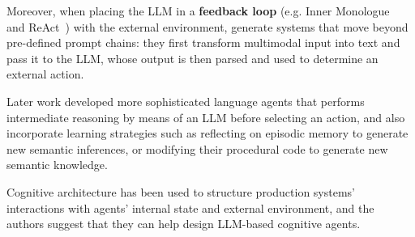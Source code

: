 Moreover, when placing the \ac{LLM} in a \textbf{feedback loop} (e.g. Inner
Monologue~\cite{huang2022innermonologueembodiedreasoning} and
ReAct~\cite{yao2023reactsynergizingreasoningacting}) with the external
environment, generate systems that move beyond pre-defined prompt chains: they
first transform multimodal input into text and pass it to the \ac{LLM}, whose
output is then parsed and used to determine an external action.

Later work developed more sophisticated language agents that performs
intermediate reasoning by means of an \ac{LLM} before selecting an action, and
also incorporate learning strategies such as reflecting on episodic memory to
generate new semantic inferences, or modifying their procedural code to
generate new semantic knowledge.

Cognitive architecture has been used to structure production systems'
interactions with agents' internal state and external environment, and the
authors suggest that they can help design \ac{LLM}-based cognitive agents.

